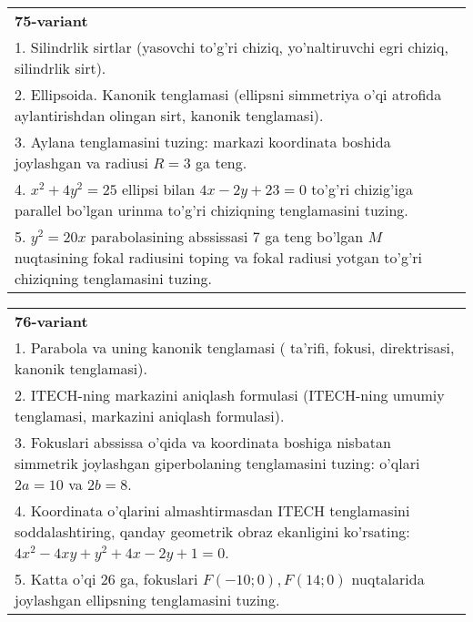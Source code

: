 \documentclass{article}
\begin{document}
\begin{tabular}{m{17cm}}
\textbf{75-variant}\\
1. Silindrlik sirtlar (yasovchi to'g'ri chiziq, yo'naltiruvchi egri chiziq, silindrlik sirt).\\

2. Ellipsoida. Kanonik tenglamasi (ellipsni simmetriya o'qi atrofida aylantirishdan olingan sirt, kanonik tenglamasi).\\

3. Aylana tenglamasini tuzing: markazi koordinata boshida joylashgan va radiusi $R=3$ ga teng.\\

4. $x^{2} + 4y^{2} = 25$ ellipsi bilan $4x - 2y + 23 = 0$ to'g'ri chizig'iga parallel bo'lgan urinma to'g'ri chiziqning tenglamasini tuzing.  \\

5. $y^{2} = 20x$ parabolasining abssissasi 7 ga teng bo'lgan $M$ nuqtasining fokal radiusini toping va fokal radiusi yotgan to'g'ri chiziqning tenglamasini tuzing.  
\end{tabular}
\vspace{1cm}


\begin{tabular}{m{17cm}}
\textbf{76-variant}\\
1. Parabola va uning kanonik tenglamasi ( ta'rifi, fokusi, direktrisasi, kanonik tenglamasi).\\

2. ITECH-ning markazini aniqlash formulasi (ITECH-ning umumiy tenglamasi, markazini aniqlash formulasi).\\

3. Fokuslari abssissa o'qida va koordinata boshiga nisbatan simmetrik joylashgan giperbolaning tenglamasini tuzing: o'qlari $2a=10$ va $2b=8$.\\

4. Koordinata o'qlarini almashtirmasdan ITECH tenglamasini soddalashtiring, qanday geometrik obraz ekanligini ko'rsating: $4x^{2} - 4xy + y^{2} + 4x - 2y + 1 = 0$.  \\

5. Katta o'qi 26 ga, fokuslari $F( - 10;0), F(14;0)$ nuqtalarida joylashgan ellipsning tenglamasini tuzing.  
\end{tabular}
\vspace{1cm}
\end{document}
